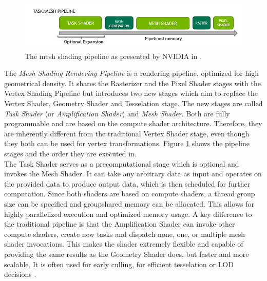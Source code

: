 \begin{figure}[h]
    \centering
    \includegraphics[width=\linewidth]{images/graphics/mesh-rendering-pipeline.png}
    \caption{The mesh shading pipeline as presented by NVIDIA in \cite{Kubisch2018}.}
    \label{fig:mesh-rendering-pipeline}
\end{figure}

\noindent
The \emph{Mesh Shading Rendering Pipeline} is a rendering pipeline, optimized for high geometrical 
density. It shares the Rasterizer and the Pixel Shader stages with the Vertex Shading Pipeline but 
introduces two new stages which aim to replace the Vertex Shader, Geometry Shader and Tesselation stage.
The new stages are called \emph{Task Shader} (or \emph{Amplification Shader}) and \emph{Mesh Shader}. Both 
are fully programmable and are based on the compute shader architecture. Therefore, they are inherently different 
from the traditional Vertex Shader stage, even though they both can be used for vertex transformations.
Figure \ref{fig:mesh-rendering-pipeline} shows the pipeline stages and the order they are executed in. \\

\noindent
The Task Shader serves as a precomputational stage which is optional and invokes the Mesh Shader.
It can take any arbitrary data as input and operates on the provided data to produce output data, which is then 
scheduled for further computation. Since both shaders are based on compute shaders, a thread group size can be 
specified  and groupshared memory can be allocated. This allows for highly parallelized execution and optimized 
memory usage. A key difference to the traditional pipeline is that the Amplification Shader can invoke other 
compute shaders, create new tasks and dispatch none, one, or multiple mesh shader invocations. This makes the 
shader extremely flexible and capable of providing the same results as the Geometry Shader does, but faster and 
more scalable. It is often used for early culling, for efficient tesselation or \ac{LOD} decisions \cite{Kubisch2018}. \\

